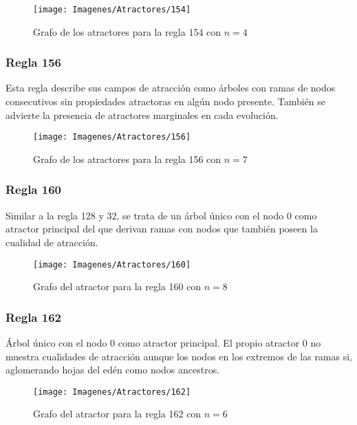 \documentclass[]{article}
\begin{document}
				\hfill\break
				\hfill\break
				\begin{figure}[!h]
					\centering
					\texttt{[image: Imagenes/Atractores/154]}
					\caption{Grafo de los atractores para la regla 154 con $n=4$}
					\label{Regla_154}
				\end{figure}
			
			\newpage
			\subsubsection{Regla 156}
				\justifying	
				Esta regla describe sus campos de atracción como árboles con ramas de nodos consecutivos sin propiedades atractoras en algún nodo presente. También se advierte la presencia de atractores marginales en cada evolución.
				
				\hfill\break
				\hfill\break
				\begin{figure}[!h]
					\centering
					\texttt{[image: Imagenes/Atractores/156]}
					\caption{Grafo de los atractores para la regla 156 con $n=7$}
					\label{Regla_156}
				\end{figure}
			
			\newpage
			\subsubsection{Regla 160}
				\justifying		
				Similar a la regla 128 y 32, se trata de un árbol único con el nodo 0 como atractor principal del que derivan ramas con nodos que también poseen la cualidad de atracción.
				
				\hfill\break
				\hfill\break
				\begin{figure}[!h]
					\centering
					\texttt{[image: Imagenes/Atractores/160]}
					\caption{Grafo del atractor para la regla 160 con $n=8$}
					\label{Regla_160}
				\end{figure}
			
			\newpage
			\subsubsection{Regla 162}
				\justifying		
				Árbol único con el nodo 0 como atractor principal. El propio atractor 0 no muestra cualidades de atracción aunque los nodos en los extremos de las ramas si, aglomerando hojas del edén como nodos ancestros.
				
				\hfill\break
				\hfill\break
				\begin{figure}[!h]
					\centering
					\texttt{[image: Imagenes/Atractores/162]}
					\caption{Grafo del atractor para la regla 162 con $n=6$}
					\label{Regla_162}
				\end{figure}
			
\end{document}
